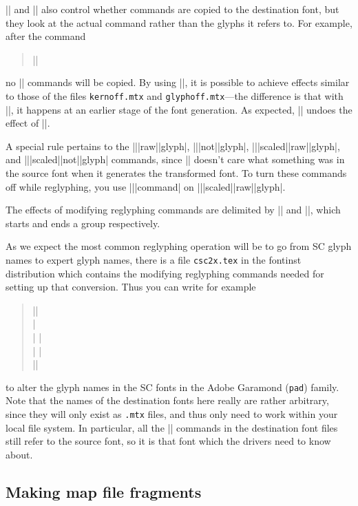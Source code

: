 \documentclass[a4paper]{ltxguide}
\newcommand*{\setpackagename}[1]{\textsf{#1}}
\newcommand{\fontinst}{\setpackagename{font\-inst}\xspace}
\begin{document}
|\offmtxcommand| and |\onmtxcommand| also control whether commands are 
copied to the destination font, but they look at the actual command 
rather than the glyphs it refers to. For example, after the command
\begin{quote}
  |\offmtxcommand{\setkern}|
\end{quote}
no |\setkern| commands will be copied. By using |\offmtxcommand|, it 
is possible to achieve effects similar to those of the files 
\texttt{kernoff.mtx} and \texttt{glyphoff.mtx}---the difference is 
that with |\offmtxcommand|, it happens at an earlier stage of the font 
generation. As expected, |\onmtxcommand| undoes the effect of 
|\offmtxcommand|.

A special rule pertains to the |\set|\-|raw|\-|glyph|, 
|\set|\-|not|\-|glyph|, |\set|\-|scaled|\-|raw|\-|glyph|, and 
|\set|\-|scaled|\-|not|\-|glyph| commands, since |\transformfont| 
doesn't care what something was in the source font when it generates 
the transformed font. To turn these commands off while reglyphing, 
you use |\offmtx|\-|command| on |\set|\-|scaled|\-|raw|\-|glyph|.

The effects of modifying reglyphing commands are delimited by 
|\reglyphfonts| and |\endreglyphfonts|, which starts and ends a group 
respectively.

As we expect the most common reglyphing operation will be to go from SC 
glyph names to expert glyph names, there is a file \texttt{csc2x.tex} 
in the \fontinst distribution which contains the modifying 
reglyphing commands needed for setting up that conversion. Thus you 
can write for example
\begin{quote}
  |\reglyphfonts|\\
  |  \\
  |  |\\
  |  |\\
  |\endreglyphfonts|
\end{quote}
to alter the glyph names in the SC fonts in the Adobe Garamond 
(\texttt{pad}) family. 
Note that the names of the destination fonts here really are rather 
arbitrary, since they will only exist as \texttt{.mtx} files, and 
thus only need to work within your local file system. In particular, 
all the |\setrawglyph| commands in the destination font files still 
refer to the source font, so it is that font which the drivers need 
to know about.


\subsection{Making map file fragments}
\end{document}
